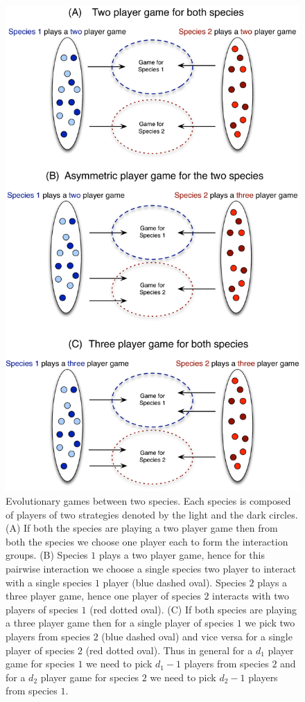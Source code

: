 \documentclass[aps,pre,amsfonts,floatfix, onecolumn,showkeys]{revtex4-1}
\begin{document}
\begin{figure}
\begin{center}
\includegraphics[scale=0.4]{concept}
\end{center}
\caption{
Evolutionary games between two species.
Each species is composed of players of two strategies denoted by the light and the dark circles.
(A) If both the species are playing a two player game then from both the species we choose one player each to form the interaction groups.
(B) Species $1$ plays a two player game, hence for this pairwise interaction we choose a single species two player to interact with a single species $1$ player (blue dashed oval). Species $2$ plays a three player game, hence one player of species $2$ interacts with two players of species $1$ (red dotted oval).
(C) If both species are playing a three player game then for a single player of species $1$ we pick two players from species $2$ (blue dashed oval) and vice versa for a single player of species $2$ (red dotted oval).
Thus in general for a $d_1$ player game for species $1$ we need to pick $d_1 - 1$ players from species $2$ and for a $d_2$ player game for species $2$ we need to pick $d_2 -1$ players from species $1$.
}
\label{fig:concept}
\end{figure}
\end{document}

